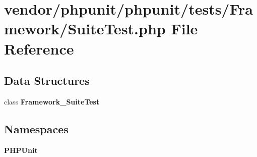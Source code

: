 \section{vendor/phpunit/phpunit/tests/\+Framework/\+Suite\+Test.php File Reference}
\label{_suite_test_8php}
\subsection*{Data Structures}
\begin{DoxyCompactItemize}
\item 
class {\bf Framework\+\_\+\+Suite\+Test}
\end{DoxyCompactItemize}
\subsection*{Namespaces}
\begin{DoxyCompactItemize}
\item 
 {\bf P\+H\+P\+Unit}
\end{DoxyCompactItemize}

